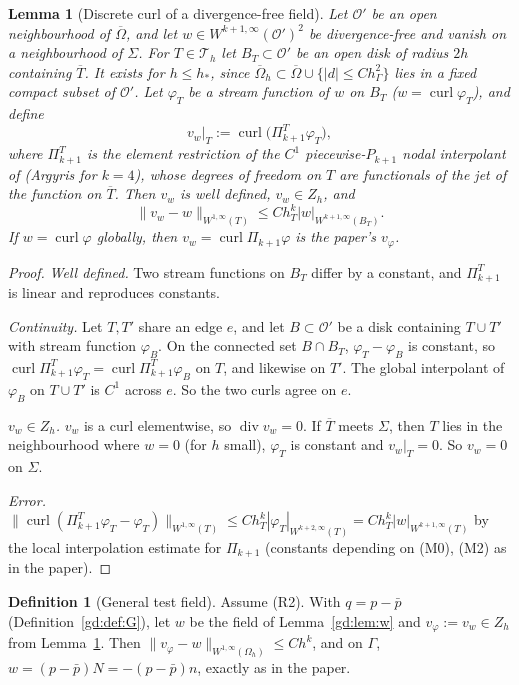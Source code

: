 \documentclass[11pt,reqno]{amsart}
\theoremstyle{plain}
\newtheorem{lemma}[theorem]{Lemma}
\theoremstyle{definition}
\newtheorem{definition}[theorem]{Definition}
\newcommand{\hG}{h_\Gamma}
\newcommand{\Oh}{\Omega_h}
\newcommand{\Th}{\mathcal T_h}
\newcommand{\Zh}{Z_h}
\newcommand{\pbar}{\bar p}
\newcommand{\norm}[1]{\lVert #1\rVert}
\newcommand{\curl}{\operatorname{curl}}
\renewcommand{\div}{\operatorname{div}}
\begin{document}
\begin{lemma}[Discrete curl of a divergence-free field]\label{gd:lem:curlint}
Let $\mathcal O'$ be an open neighbourhood of $\overline\Omega$, and let $w\in W^{k+1,\infty}(\mathcal O')^2$ be divergence-free and vanish on a neighbourhood of $\Sigma$. For $T\in\Th$ let $B_T\subset\mathcal O'$ be an open disk of radius $2h$ containing $\overline T$. It exists for $h\le h_\ast$, since $\overline\Oh\subset\overline\Omega\cup\{|d|\le C\hG^2\}$ lies in a fixed compact subset of $\mathcal O'$. Let $\varphi_T$ be a stream function of $w$ on $B_T$ ($w=\curl\varphi_T$), and define
\[
v_w|_T:=\curl\bigl(\Pi_{k+1}^T\varphi_T\bigr),
\]
where $\Pi^T_{k+1}$ is the element restriction of the $C^1$ piecewise-$P_{k+1}$ nodal interpolant of \cite{MorganScott1975} (Argyris for $k=4$), whose degrees of freedom on $T$ are functionals of the jet of the function on $\overline T$. Then $v_w$ is well defined, $v_w\in\Zh$, and
\[
\norm{v_w-w}_{W^{1,\infty}(T)}\le Ch_T^k|w|_{W^{k+1,\infty}(B_T)}.
\]
If $w=\curl\varphi$ globally, then $v_w=\curl\Pi_{k+1}\varphi$ is the paper's $v_\varphi$.
\end{lemma}

\begin{proof}
\emph{Well defined.} Two stream functions on $B_T$ differ by a constant, and $\Pi^T_{k+1}$ is linear and reproduces constants.

\emph{Continuity.} Let $T,T'$ share an edge $e$, and let $B\subset\mathcal O'$ be a disk containing $T\cup T'$ with stream function $\varphi_B$. On the connected set $B\cap B_T$, $\varphi_T-\varphi_B$ is constant, so $\curl\Pi^T_{k+1}\varphi_T=\curl\Pi^T_{k+1}\varphi_B$ on $T$, and likewise on $T'$. The global interpolant of $\varphi_B$ on $T\cup T'$ is $C^1$ across $e$. So the two curls agree on $e$.

\emph{$v_w\in\Zh$.} $v_w$ is a curl elementwise, so $\div v_w=0$. If $\overline T$ meets $\Sigma$, then $T$ lies in the neighbourhood where $w=0$ (for $h$ small), $\varphi_T$ is constant and $v_w|_T=0$. So $v_w=0$ on $\Sigma$.

\emph{Error.} $\norm{\curl(\Pi^T_{k+1}\varphi_T-\varphi_T)}_{W^{1,\infty}(T)}\le Ch_T^k|\varphi_T|_{W^{k+2,\infty}(T)}=Ch_T^k|w|_{W^{k+1,\infty}(T)}$ by the local interpolation estimate for $\Pi_{k+1}$ (constants depending on (M0), (M2) as in the paper).
\end{proof}

\begin{definition}[General test field]\label{gd:def:vphi}
Assume (R2). With $q=p-\pbar$ (Definition~\ref{gd:def:G}), let $w$ be the field of Lemma~\ref{gd:lem:w} and $v_\varphi:=v_w\in\Zh$ from Lemma~\ref{gd:lem:curlint}. Then $\norm{v_\varphi-w}_{W^{1,\infty}(\Oh)}\le Ch^k$, and on $\Gamma$, $w=(p-\pbar)N=-(p-\pbar)n$, exactly as in the paper.
\end{definition}
\end{document}
